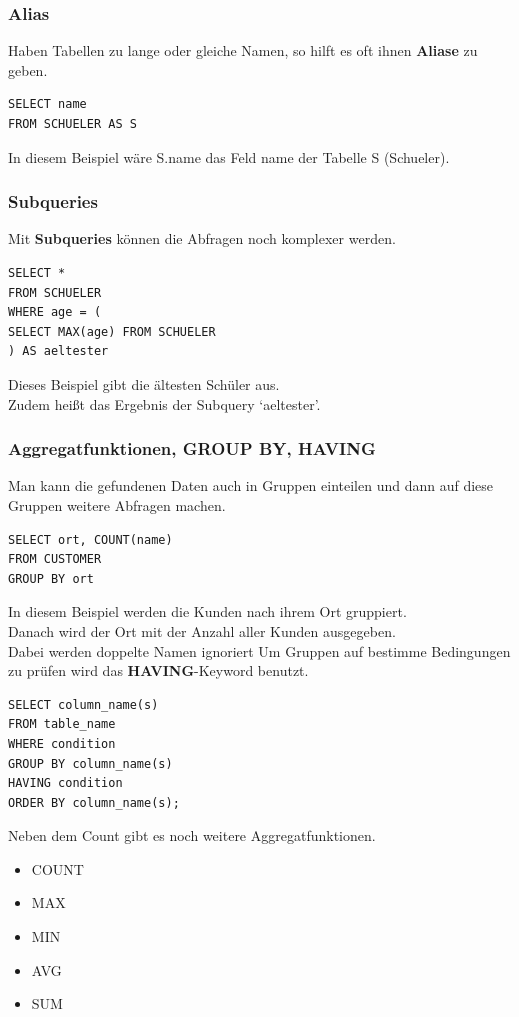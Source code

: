 \documentclass[10pt]{article}
\begin{document}
\subsubsection{Alias}
Haben Tabellen zu lange oder gleiche Namen, so hilft es oft ihnen \textbf{Aliase} zu geben.
\begin{lstlisting}
SELECT name 
FROM SCHUELER AS S
\end{lstlisting}
In diesem Beispiel wäre S.name das Feld name der Tabelle S (Schueler).

\subsubsection{Subqueries}
Mit \textbf{Subqueries} können die Abfragen noch komplexer werden.
\begin{lstlisting}
SELECT * 
FROM SCHUELER 
WHERE age = (
SELECT MAX(age) FROM SCHUELER
) AS aeltester
\end{lstlisting}
Dieses Beispiel gibt die ältesten Schüler aus. \\
Zudem heißt das Ergebnis  der Subquery `aeltester'.

\subsubsection{Aggregatfunktionen, GROUP BY, HAVING}

Man kann die gefundenen Daten auch in Gruppen einteilen und dann auf diese Gruppen weitere Abfragen machen. 
\begin{lstlisting}
SELECT ort, COUNT(name)
FROM CUSTOMER
GROUP BY ort 
\end{lstlisting}
In diesem Beispiel werden die Kunden nach ihrem Ort gruppiert. \\
Danach wird der Ort mit der Anzahl aller Kunden ausgegeben. \\
Dabei werden doppelte Namen ignoriert
Um Gruppen  auf bestimme  Bedingungen zu prüfen wird das \textbf{HAVING}-Keyword benutzt. \\

\break

\begin{lstlisting}
SELECT column_name(s)
FROM table_name
WHERE condition
GROUP BY column_name(s)
HAVING condition
ORDER BY column_name(s);
\end{lstlisting}
Neben dem Count gibt es noch weitere Aggregatfunktionen. \\
\begin{itemize}
\item COUNT
\item MAX
\item MIN
\item AVG
\item SUM
\end{itemize}
\end{document}
